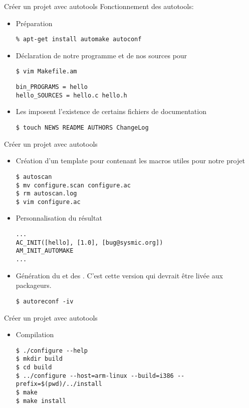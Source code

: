 \begin{frame}[fragile=singleslide]{Créer un projet avec autotools}
  Fonctionnement des autotools:
  \begin{itemize}
  \item Préparation 
\begin{lstlisting}
% apt-get install automake autoconf
\end{lstlisting}
  \item Déclaration de notre programme et de nos sources pour 
\begin{lstlisting}
$ vim Makefile.am
\end{lstlisting} %
\begin{lstlisting}
bin_PROGRAMS = hello
hello_SOURCES = hello.c hello.h
\end{lstlisting}
  \item Les   imposent l'existence de certains fichiers
    de documentation
\begin{lstlisting}
$ touch NEWS README AUTHORS ChangeLog
\end{lstlisting} %
  \end{itemize}
\end{frame}

\begin{frame}[fragile=singleslide]{Créer un projet avec autotools}
  \begin{itemize}
  \item  Création  d'un  template  pour   contenant  les
    macros utiles pour notre projet
\begin{lstlisting}
$ autoscan
$ mv configure.scan configure.ac
$ rm autoscan.log
$ vim configure.ac
\end{lstlisting}
  \item Personnalisation du résultat
\begin{lstlisting}
...
AC_INIT([hello], [1.0], [bug@sysmic.org])
AM_INIT_AUTOMAKE
...
\end{lstlisting}
  \item      Génération      du            et      des
    . C'est cette version qui devrait être livée aux
    packageurs.
\begin{lstlisting}
$ autoreconf -iv
\end{lstlisting} %
  \end{itemize}
\end{frame}

\begin{frame}[fragile=singleslide]{Créer un projet avec autotools}
  \begin{itemize}
  \item Compilation
\begin{lstlisting}
$ ./configure --help
$ mkdir build
$ cd build
$ ../configure --host=arm-linux --build=i386 --prefix=$(pwd)/../install
$ make
$ make install
\end{lstlisting} %
  \end{itemize}
\end{frame}

